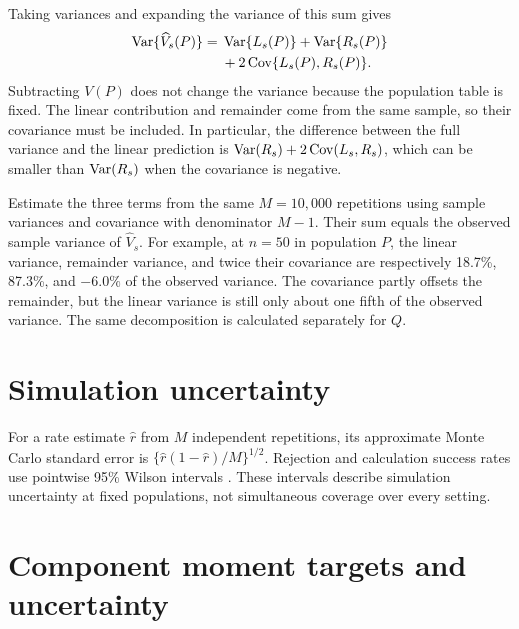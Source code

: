 Taking variances and expanding the variance of this sum gives
\begin{equation}
\begin{aligned}
 \operatorname{Var}\{\widehat V_s(P)\}
 ={}&\operatorname{Var}\{L_s(P)\}+\operatorname{Var}\{R_s(P)\}\\
    &+2\operatorname{Cov}\{L_s(P),R_s(P)\}.
\end{aligned}
 \label{eq:linear-remainder-variance-decomposition}
\end{equation}
Subtracting \(V(P)\) does not change the variance because the population
table is fixed. The linear contribution and remainder come from the same
sample, so their covariance must be included. In particular, the
difference between the full variance and the linear prediction is
\(\operatorname{Var}(R_s)+2\operatorname{Cov}(L_s,R_s)\), which can be smaller than
\(\operatorname{Var}(R_s)\) when the covariance is negative.

Estimate the three terms from the same \(M=10{,}000\) repetitions using sample
variances and covariance with denominator \(M-1\). Their sum equals the
observed sample variance of \(\widehat V_s\). For example, at \(n=50\)
in population \(P\), the linear variance, remainder variance, and twice
their covariance are respectively 18.7\%, 87.3\%, and \(-6.0\%\) of
the observed variance. The covariance partly offsets the remainder, but
the linear variance is still only about one fifth of the observed
variance. The same decomposition is calculated separately for \(Q\).

\section{Simulation uncertainty}
\label{sec:simulation-uncertainty}

For a rate estimate \(\widehat r\) from \(M\) independent repetitions,
its approximate Monte Carlo standard error is
\(\{\widehat r(1-\widehat r)/M\}^{1/2}\).
Rejection and calculation success rates use pointwise 95\% Wilson intervals
\citep{wilson1927}. These intervals describe simulation uncertainty at fixed
populations, not simultaneous coverage over every setting.

\section{Component moment targets and uncertainty}
\label{sec:moment-target-details}
\label{sec:moment-uncertainty}


